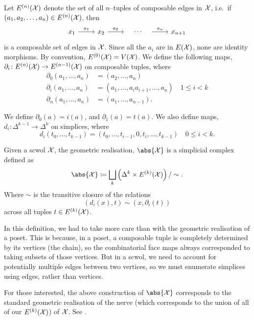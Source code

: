 Let $E^{(n)}(\mathcal{X})$ denote the set of all $n$--tuples of composable edges in $\mathcal{X}$,
i.e.~if $(a_1, a_2, \ldots, a_n) \in E^{(n)}(\mathcal{X})$, then
\[
	\begin{tikzcd}
		x_1 \ar[r, "a_1"] & x_2 \ar[r, "a_2"] & {} \ar[r, phantom, "\cdots"] & {} \ar[r, "a_n"] & x_{n+1}
	\end{tikzcd}
\]
is a composable set of edges in $\mathcal{X}$.
Since all the $a_i$ are in $E(\mathcal{X})$, none are identity morphisms.
By convention, $E^{(0)}(\mathcal{X}) = V(\mathcal{X})$.
We define the following maps, $\partial_i \colon E^{(n)}(\mathcal{X}) \to E^{(n-1)}(\mathcal{X})$ on composable tuples, where
\begin{align*}
	\partial_0(a_1,\ldots,a_n) & = (a_2,\ldots,a_n)                                          \\
	\partial_i(a_1,\ldots,a_n) & = (a_1, \ldots, a_ia_{i+1}, \ldots, a_n) \quad 1 \leq i < k \\
	\partial_n(a_1,\ldots,a_n) & = (a_1, \ldots, a_{n-1})
	.\end{align*}

We define $\partial_0(a)=i(a)$, and $\partial_1(a)=t(a)$.
We also define maps, $d_i \colon \Delta^{k-1} \to \Delta^k$ on simplices, where
\[
	d_i(t_0, \ldots, t_{k-1}) = (t_0, \ldots, t_{i-1}, 0, t_i, \ldots, t_{k-1}) \quad 0 \leq i < k
	.\]

\begin{definition}
	Given a scwol $\mathcal{X}$, the geometric realisation, $\abs{\calx}$ is a simplicial complex defined as
	\[
		\abs{\calx} \coloneq \bigsqcup_k \left( \Delta^k \times E^{(k)}(\calx) \right) / \sim
		.\]
	Where $\sim$ is the transitive closure of the relations
	\[
		(d_i(x),t) \sim (x, \partial_i(t))
	\]
	across all tuples $t \in E^{(k)}(\mathcal{X})$.
	\label{def:geometric_realisation_of_scwol}
\end{definition}
In this definition, we had to take more care than with the geometric realisation of a poset.
This is because, in a poset, a composable tuple is completely determined by its vertices (the chain), so the combinatorial face maps always corresponded to taking subsets of those vertices.
But in a scwol, we need to account for potentially multiple edges between two vertices, so we must enumerate simplices using edges, rather than vertices.

For those interested, the above construction of $\abs{\calx}$ corresponds to the standard geometric realisation of the nerve (which corresponds to the union of all of our $E^{(k)}(\mathcal{X})$) of $\mathcal{X}$.
See \cite{goerss_simplicial_2009}.

